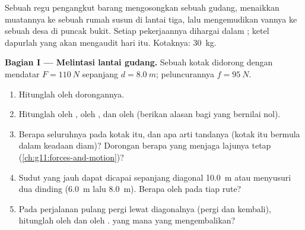\begin{problem}
\label{pb:g11:work-of-force:1}
Sebuah regu pengangkut barang mengosongkan sebuah gudang, menaikkan
muatannya ke sebuah rumah susun di lantai tiga, lalu mengemudikan
vannya ke sebuah desa di puncak bukit. Setiap pekerjaannya dihargai
dalam ; ketel dapurlah yang akan mengaudit hari itu. Kotaknya:
\qty{30}{kg}.

\medskip
\noindent\textbf{Bagian I --- Melintasi lantai gudang.}
Sebuah kotak didorong dengan  mendatar $F = \qty{110}{N}$ sepanjang
$d = \qty{8.0}{m}$;  peluncurannya $f = \qty{95}{N}$.
\begin{enumerate}
  \item Hitunglah  oleh dorongannya.
  \item Hitunglah  oleh , oleh , dan oleh  (berikan alasan bagi yang bernilai nol).
  \item Berapa  seluruhnya pada kotak itu, dan apa arti tandanya
        (kotak itu bermula dalam keadaan diam)? Dorongan berapa yang
        menjaga lajunya tetap (\cref{ch:g11:forces-and-motion})?
  \item Sudut yang jauh dapat dicapai sepanjang diagonal \qty{10.0}{m}
        atau menyusuri dua dinding (\qty{6.0}{m} lalu \qty{8.0}{m}).
        Berapa  oleh  pada tiap rute?
  \item Pada perjalanan pulang pergi lewat diagonalnya (pergi dan
        kembali), hitunglah  oleh  dan  oleh
        .  yang mana yang mengembalikan?
\end{enumerate}


\end{problem}
